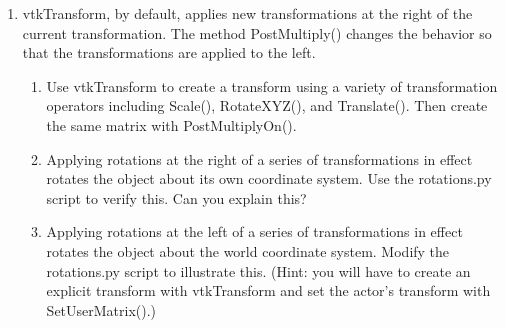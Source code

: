 \begin{enumerate}
\item vtkTransform, by default, applies new transformations at the right of the current transformation. The method PostMultiply() changes the behavior so that the transformations are applied to the left.

\begin{enumerate}

\item Use vtkTransform to create a transform using a variety of transformation operators including Scale(), RotateXYZ(), and Translate(). Then create the same matrix with PostMultiplyOn().

\item Applying rotations at the right of a series of transformations in effect rotates the object about its own coordinate system. Use the rotations.py script to verify this. Can you explain this?

\item Applying rotations at the left of a series of transformations in effect rotates the object about the world coordinate system. Modify the rotations.py script to illustrate this. (Hint: you will have to create an explicit transform with vtkTransform and set the actor's transform with SetUserMatrix().)

\end{enumerate}

\end{enumerate}
